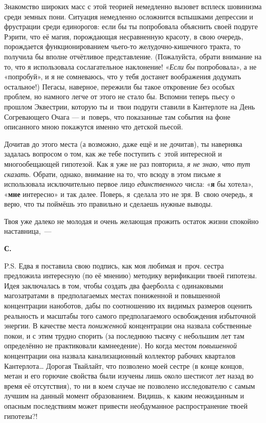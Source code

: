 \documentclass[fontsize=11pt,a5paper,titlepage=firstcover]{scrbook}
\begin{document}
Знакомство широких масс с этой теорией немедленно вызовет всплеск шовинизма среди земных пони. Ситуация немедленно осложнится вспышками депрессии и фрустрации среди единорогов: если бы ты попробовала объяснить своей подруге Рэрити, что её магия, порождающая несравненную красоту, в свою очередь, порождается функционированием чьего-то желудочно-кишечного тракта, то получила бы вполне отчётливое представление. (Пожалуйста, обрати внимание на то, что я использовала сослагательное наклонение! «\emph{Если бы} попробовала», а не «попробуй», и я не сомневаюсь, что у тебя достанет воображения додумать остальное!) Пегасы, наверное, пережили бы такое откровение без особых проблем, но намного легче от этого не стало бы. Вспомни теперь пьесу о прошлом Эквестрии, которую ты и~твои подруги ставили в Кантерлоте на День Согревающего Очага --- и~поверь, что показанные там события на фоне описанного мною покажутся именно что детской пьесой.

Дочитав до этого места (а возможно, даже ещё и не дочитав), ты наверняка задалась вопросом о том, как же тебе поступить с~этой интересной и многообещающей гипотезой. Как я уже не раз повторила, \emph{я не знаю, что тут сказать}. Обрати, однако, внимание на то, что всюду в этом письме я использовала исключительно первое лицо \emph{единственного} числа: «\textbf{я} бы хотела», «\textbf{мне} интересно» и так далее. Поверь, я~сделала это не зря. В~свою очередь, я верю, что ты поймёшь это правильно и сделаешь нужные выводы.

Твоя уже далеко не молодая и очень желающая прожить остаток жизни спокойно наставница,~---
\begin{flushright}\textbf{С.}\end{flushright}
P.S. Едва я поставила свою подпись, как моя любимая и~проч. сестра предложила интересную (по её мнению) методику верификации твоей гипотезы. Идея заключалась в том, чтобы создать два фаерболла с одинаковыми магозатратами в~предполагаемых местах пониженной и повышенной концентрации наноботов, дабы по соотношению их видимых размеров оценить реальность и масштабы того самого предполагаемого освобождения избыточной энергии. В качестве места \emph{пониженной} концентрации она назвала собственные покои, и с этим трудно спорить (за последнюю тысячу с небольшим лет там определённо не практиковали камнеедение). Но когда местом \emph{повышенной} концентрации она назвала канализационный коллектор рабочих кварталов Кантерлота{\ldots} Дорогая Твайлайт, что позволено моей сестре (в конце концов, метан и его горючие свойства были изучены лишь около шестисот лет назад во время её отсутствия), то ни в коем случае не позволено исследователю с самым лучшим на данный момент образованием. Видишь, к~каким неожиданным и опасным последствиям может привести необдуманное распространение твоей гипотезы?!
\end{document}
